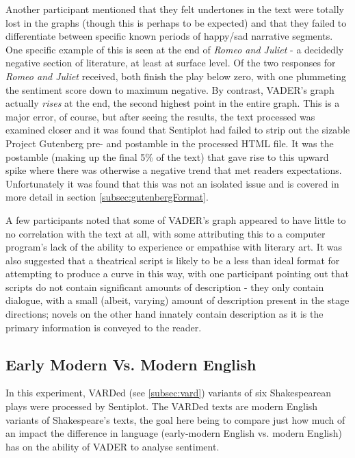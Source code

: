 \documentclass{article}
\begin{document}
{                Another participant mentioned that they felt undertones in the text were totally lost in the graphs (though this is perhaps to be expected) and that they failed to differentiate between specific known periods of happy/sad narrative segments. One specific example of this is seen at the end of \textit{Romeo and Juliet} - a decidedly negative section of literature, at least at surface level. Of the two responses for \textit{Romeo and Juliet} received, both finish the play below zero, with one plummeting the sentiment score down to maximum negative. By contrast, VADER's graph actually \textit{rises} at the end, the second highest point in the entire graph. This is a major error, of course, but after seeing the results, the text processed was examined closer and it was found that Sentiplot had failed to strip out the sizable Project Gutenberg pre- and postamble in the processed HTML file. It was the postamble (making up the final 5\% of the text) that gave rise to this upward spike where there was otherwise a negative trend that met readers expectations. Unfortunately it was found that this was not an isolated issue and is covered in more detail in section \ref{subsec:gutenbergFormat}.
                
                A few participants noted that some of VADER's graph appeared to have little to no correlation with the text at all, with some attributing this to a computer program's lack of the ability to experience or empathise with literary art. It was also suggested that a theatrical script is likely to be a less than ideal format for attempting to produce a curve in this way, with one participant pointing out that scripts do not contain significant amounts of description - they only contain dialogue, with a small (albeit, varying) amount of description present in the stage directions; novels on the other hand innately contain description as it is the primary information is conveyed to the reader.
    \subsection{Early Modern Vs. Modern English}
    \label{subsec:EMvME}
        In this experiment, VARDed (see \ref{subsec:vard}) variants of six Shakespearean plays were processed by Sentiplot. The VARDed texts are modern English variants of Shakespeare's texts, the goal here being to compare just how much of an impact the difference in language (early-modern English vs. modern English) has on the ability of VADER to analyse sentiment.

}
\end{document}
